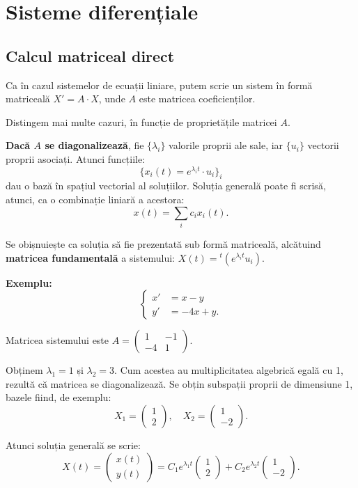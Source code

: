 \chapter{Sisteme diferențiale}

\section{Calcul matriceal direct}

Ca în cazul sistemelor de ecuații liniare, putem scrie un sistem în formă matriceală $X' = A \cdot X$,
unde $A$ este matricea coeficienților.

Distingem mai multe cazuri, în funcție de proprietățile matricei $A$.

\textbf{Dacă $A$ se diagonalizează}, fie $\{\lambda_i\}$ valorile proprii ale sale,
iar $\{u_i\}$ vectorii proprii asociați. Atunci funcțiile:
\[
  \{ x_i(t) = e^{\lambda_i t} \cdot u_i \}_i
\]
dau o bază în spațiul vectorial al soluțiilor. Soluția generală poate fi scrisă,
atunci, ca o combinație liniară a acestora:
\[
  x(t) = \sum_i c_i x_i(t).
\]

Se obișnuiește ca soluția să fie prezentată sub formă matriceală, alcătuind
\textbf{matricea fundamentală} a sistemului: $X(t) = {}^t (e^{\lambda_i t} u_i)$.

\vspace{0.5cm}

\textbf{Exemplu:}
\[
  \begin{cases}
    x' &= x - y \\
    y' &= -4x + y.
  \end{cases}
\]

Matricea sistemului este $A = \begin{pmatrix} 1 & -1 \\ -4 & 1 \end{pmatrix}$.

Obținem $\lambda_1 = 1$ și $\lambda_2 = 3$. Cum acestea au multiplicitatea algebrică
egală cu 1, rezultă că matricea se diagonalizează. Se obțin subspații proprii de dimensiune
1, bazele fiind, de exemplu:
\[
  X_1 = \begin{pmatrix} 1 \\ 2 \end{pmatrix}, \quad
  X_2 = \begin{pmatrix} 1 \\ -2 \end{pmatrix}.
\]

Atunci soluția generală se scrie:
\[
  X(t) = \begin{pmatrix} x(t) \\ y(t) \end{pmatrix} = %
  C_1 e^{\lambda_1 t} \begin{pmatrix} 1 \\ 2 \end{pmatrix} + %
  C_2 e^{\lambda_2 t} \begin{pmatrix} 1 \\ -2 \end{pmatrix}.
\]

